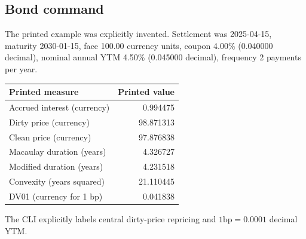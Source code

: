 \documentclass[12pt,a4paper]{article}
\newcommand{\bp}{\mathrm{bp}}
\begin{document}
\subsection{Bond command}
The printed example was explicitly invented. Settlement was 2025-04-15,
maturity 2030-01-15, face 100.00 currency units, coupon 4.00\%
(0.040000 decimal), nominal annual YTM 4.50\% (0.045000 decimal),
frequency 2 payments per year.
\begin{center}
\begin{tabular}{@{}lr@{}}
\toprule
Printed measure & Printed value\\
\midrule
Accrued interest (currency) & 0.994475\\
Dirty price (currency) & 98.871313\\
Clean price (currency) & 97.876838\\
Macaulay duration (years) & 4.326727\\
Modified duration (years) & 4.231518\\
Convexity (years squared) & 21.110445\\
DV01 (currency for 1 bp) & 0.041838\\
\bottomrule
\end{tabular}
\end{center}
The CLI explicitly labels central dirty-price repricing and
$1\bp=0.0001$ decimal YTM.
\end{document}
